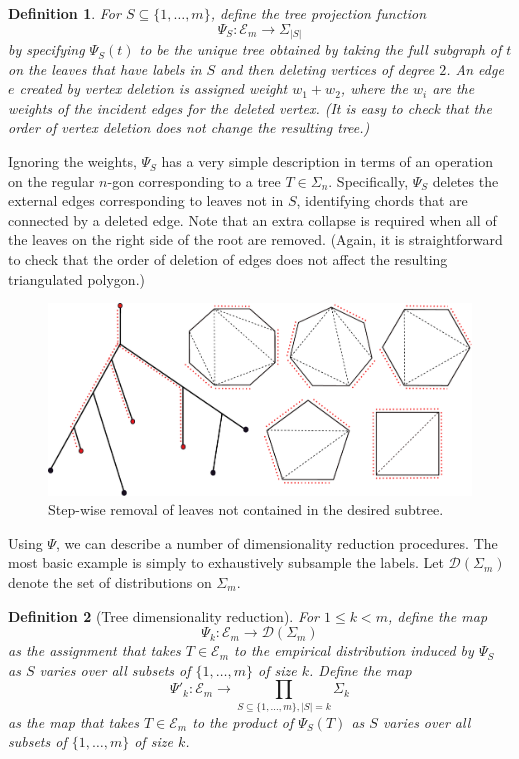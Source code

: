 \documentclass[a4paper,11pt]{article}
\newtheorem{definition}{Definition}
\newcommand{\aD}{\mathcal{D}}
\newcommand{\aE}{\mathcal{E}}
\begin{document}
\begin{definition}
For $S \subseteq \{1,\ldots,m\}$, define the tree projection function 
\[
\Psi_S \colon \aE_m \to \Sigma_{|S|}
\] 
by specifying $\Psi_S(t)$ to be the unique tree obtained by taking the full subgraph of $t$ on the leaves that have labels in $S$ and then deleting vertices of degree $2$.
An edge $e$ created by vertex deletion is assigned weight $w_1 + w_2$, where the $w_i$ are the weights of the incident edges for the deleted vertex.
(It is easy to check that the order of vertex deletion does not change the resulting tree.)
\end{definition}

Ignoring the weights, $\Psi_S$ has a very simple description in terms of an operation on the regular $n$-gon corresponding to a tree $T \in \Sigma_n$.
Specifically, $\Psi_S$ deletes the external edges corresponding to leaves not in $S$, identifying chords that are connected by a deleted edge.
Note that an extra collapse is required when all of the leaves on the right side of the root are removed.
(Again, it is straightforward to check that the order of deletion of edges does not affect the resulting triangulated polygon.)

\begin{figure}
    \centering
    \includegraphics[width=6in]{../figures/dimred_def2.pdf}
    \caption{Step-wise removal of leaves not contained in the desired subtree.}
    \label{fig:definition2}
\end{figure} 

Using $\Psi$, we can describe a number of dimensionality reduction procedures.
The most basic example is simply to exhaustively subsample the labels.
Let $\aD(\Sigma_m)$ denote the set of distributions on $\Sigma_m$.

\begin{definition}[Tree dimensionality reduction]
For $1 \leq k < m$, define the map
\[
\Psi_k \colon \aE_m \to \aD(\Sigma_m)
\]
as the assignment that takes $T \in \aE_m$ to the empirical distribution induced by $\Psi_S$ as $S$ varies over all subsets of $\{1,\ldots,m\}$ of size $k$.
Define the map
\[
\Psi'_k \colon \aE_m \to \prod_{S \subseteq \{1,\ldots,m\}, |S| = k} \Sigma_k 
\]
as the map that takes $T \in \aE_m$ to the product of $\Psi_S(T)$ as $S$ varies over all subsets of $\{1, \ldots, m\}$ of size $k$.
\end{definition}
\end{document}
